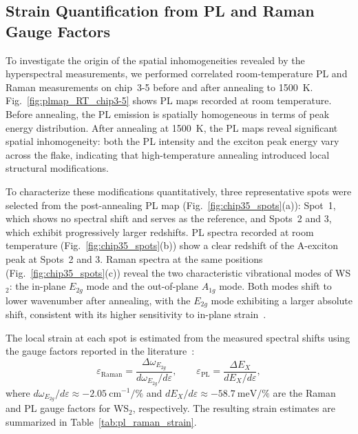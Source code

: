 \subsection{Strain Quantification from PL and Raman Gauge Factors}
\label{subsec:Strain Quantification from PL and Raman Gauge Factors}

To investigate the origin of the spatial inhomogeneities revealed by the hyperspectral measurements, we performed correlated room-temperature PL and Raman measurements on chip~3-5 before and after annealing to 1500~K. Fig.~\ref{fig:plmap_RT_chip3-5} shows PL maps recorded at room temperature. Before annealing, the PL emission is spatially homogeneous in terms of peak energy distribution. After annealing at 1500~K, the PL maps reveal significant spatial inhomogeneity: both the PL intensity and the exciton peak energy vary across the flake, indicating that high-temperature annealing introduced local structural modifications.

To characterize these modifications quantitatively, three representative spots were selected from the post-annealing PL map (Fig.~\ref{fig:chip35_spots}(a)): Spot~1, which shows no spectral shift and serves as the reference, and Spots~2 and 3, which exhibit progressively larger redshifts. PL spectra recorded at room temperature (Fig.~\ref{fig:chip35_spots}(b)) show a clear redshift of the A-exciton peak at Spots~2 and 3. Raman spectra at the same positions (Fig.~\ref{fig:chip35_spots}(c)) reveal the two characteristic vibrational modes of WS$_2$: the in-plane $E_{2g}$ mode and the out-of-plane $A_{1g}$ mode. Both modes shift to lower wavenumber after annealing, with the $E_{2g}$ mode exhibiting a larger absolute shift, consistent with its higher sensitivity to in-plane strain~\cite{wang-2020}.

The local strain at each spot is estimated from the measured spectral shifts using the gauge factors reported in the literature~\cite{wang-2020,wang-2016}:
\begin{equation}
\varepsilon_{\mathrm{Raman}} = \frac{\Delta\omega_{E_{2g}}}{d\omega_{E_{2g}}/d\varepsilon}, \qquad \varepsilon_{\mathrm{PL}} = \frac{\Delta E_X}{dE_X/d\varepsilon},
\label{eq:strain_gauge}
\end{equation}
where $d\omega_{E_{2g}}/d\varepsilon \approx -2.05~\mathrm{cm^{-1}/\%}$ and $dE_X/d\varepsilon \approx -58.7~\mathrm{meV/\%}$ are the Raman and PL gauge factors for WS$_2$, respectively. The resulting strain estimates are summarized in Table~\ref{tab:pl_raman_strain}.

